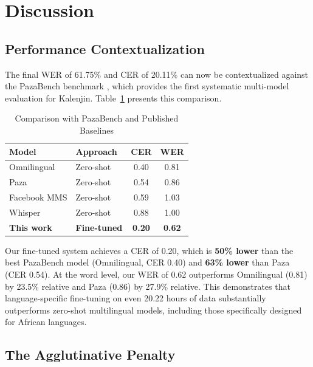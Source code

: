 \documentclass[conference]{IEEEtran}
\begin{document}
\section{Discussion}

\subsection{Performance Contextualization}

The final WER of 61.75\% and CER of 20.11\% can now be contextualized against the PazaBench benchmark \cite{b42}, which provides the first systematic multi-model evaluation for Kalenjin. Table~\ref{tab:comparison} presents this comparison.

\begin{table}[!t]
\caption{Comparison with PazaBench and Published Baselines}
\label{tab:comparison}
\centering
\small
\begin{tabular}{|l|l|c|c|}
\hline
\textbf{Model} & \textbf{Approach} & \textbf{CER} & \textbf{WER} \\
\hline
Omnilingual \cite{b42} & Zero-shot & 0.40 & 0.81 \\
\hline
Paza \cite{b42} & Zero-shot & 0.54 & 0.86 \\
\hline
Facebook MMS \cite{b42} & Zero-shot & 0.59 & 1.03 \\
\hline
Whisper \cite{b42} & Zero-shot & 0.88 & 1.00 \\
\hline
\textbf{This work} & \textbf{Fine-tuned} & \textbf{0.20} & \textbf{0.62} \\
\hline
\end{tabular}
\end{table}

Our fine-tuned system achieves a CER of 0.20, which is \textbf{50\% lower} than the best PazaBench model (Omnilingual, CER 0.40) and \textbf{63\% lower} than Paza (CER 0.54). At the word level, our WER of 0.62 outperforms Omnilingual (0.81) by 23.5\% relative and Paza (0.86) by 27.9\% relative. This demonstrates that language-specific fine-tuning on even 20.22 hours of data substantially outperforms zero-shot multilingual models, including those specifically designed for African languages.

\subsection{The Agglutinative Penalty}
\end{document}
